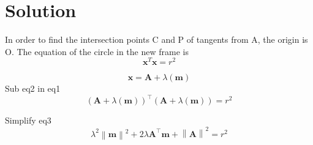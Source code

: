 \documentclass[journal,10pt,twocolumn]{article}
\providecommand{\norm}[1]{\left\lVert#1\right\rVert}
\let\vec\mathbf
\begin{document}
{\section*{Solution}
In order to find the intersection points C and P of tangents from A, the origin is  O. The equation of the circle in the new frame is
\begin{equation}
  \boldsymbol{x}^T\boldsymbol{x} = r^2
\end{equation}

\begin{equation}
	\boldsymbol{x} = \vec{A}+\lambda(\vec{m})
\end{equation}
Sub eq2 in eq1
\begin{equation}
	(\vec{A}+\lambda(\vec{m}))^\top(\vec{A}+\lambda(\vec{m}))=r^2
\end{equation}

Simplify eq3
\begin{equation}
	\lambda^{2}\norm{\boldsymbol{m}}^{2}+2\lambda\vec{A}^\top\vec{m}+\norm{\boldsymbol{A}}^{2}=r^{2}
\end{equation}

}
\end{document}
